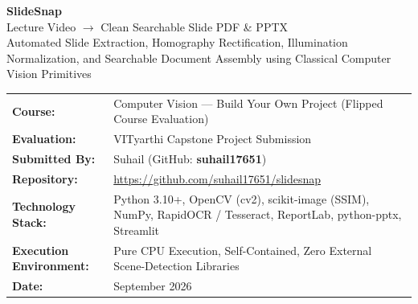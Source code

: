 \documentclass[10pt,a4paper]{article}
\begin{document}
\thispagestyle{empty}
\vspace*{10mm}

{\fontsize{26}{32}\selectfont \textbf{\color{navy}SlideSnap}}\\[4mm]
{\fontsize{13}{18}\selectfont \color{slate}Lecture Video $\to$ Clean Searchable Slide PDF \& PPTX}\\[2mm]
{\small Automated Slide Extraction, Homography Rectification, Illumination Normalization, and Searchable Document Assembly using Classical Computer Vision Primitives}\\[6mm]

\begin{tabularx}{\textwidth}{@{} p{42mm} X @{}}
\toprule
\textbf{Course:} & Computer Vision — Build Your Own Project (Flipped Course Evaluation) \\
\textbf{Evaluation:} & VITyarthi Capstone Project Submission \\
\textbf{Submitted By:} & Suhail (GitHub: \textbf{suhail17651}) \\
\textbf{Repository:} & \href{https://github.com/suhail17651/slidesnap}{https://github.com/suhail17651/slidesnap} \\
\textbf{Technology Stack:} & Python 3.10+, OpenCV (cv2), scikit-image (SSIM), NumPy, RapidOCR / Tesseract, ReportLab, python-pptx, Streamlit \\
\textbf{Execution Environment:} & Pure CPU Execution, Self-Contained, Zero External Scene-Detection Libraries \\
\textbf{Date:} & September 2026 \\
\bottomrule
\end{tabularx}

\vspace*{8mm}
\end{document}
